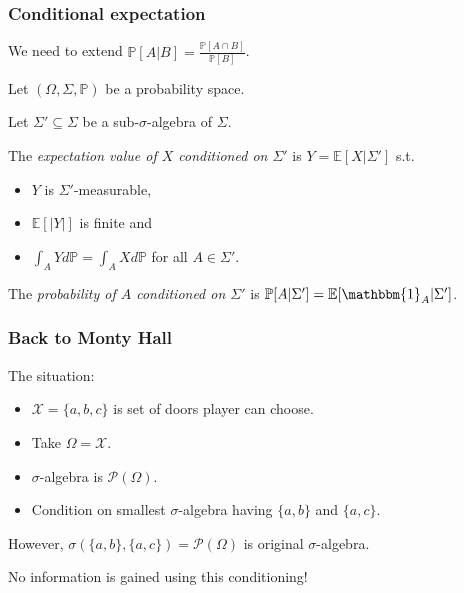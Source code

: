 \documentclass{beamer}
\theoremstyle{plain}
\theoremstyle{definition}
\theoremstyle{remark}
\renewcommand{\P}{\mathbb{P}}
\newcommand{\E}{\mathbb{E}}
\newcommand{\1}{\mathbbm{1}}
\begin{document}
\begin{frame}
\frametitle{Conditional expectation}
We need to extend $\P[A|B]=\frac{\P[A\cap B]}{\P[B]}$.\pause
\begin{definition}
Let $(\Omega,\Sigma,\P)$ be a probability space.

Let $\Sigma'\subseteq\Sigma$ be a sub-$\sigma$-algebra of $\Sigma$.

The \emph{expectation value of $X$ conditioned on $\Sigma'$} is $Y=\E[X|\Sigma']$ s.t.
\begin{itemize}
	\item $Y$ is $\Sigma'$-measurable,
	\item $\E[|Y|]$ is finite and
	\item $\int_A Yd\P=\int_A Xd\P$ for all $A\in\Sigma'$.
\end{itemize}
\end{definition}\pause

\begin{definition}
The \emph{probability of $A$ conditioned on $\Sigma'$} is $\P[A|\Sigma']=\E[\1_A|\Sigma']$.
\end{definition}
\end{frame}

\begin{frame}
\frametitle{Back to Monty Hall}
The situation:
\begin{itemize}
	\item $\mathcal{X}=\{a,b,c\}$ is set of doors player can choose.
	\item Take $\Omega=\mathcal{X}$.
	\item $\sigma$-algebra is $\mathcal{P}(\Omega)$.
	\item Condition on smallest $\sigma$-algebra having $\{a,b\}$ and $\{a,c\}$.
\end{itemize}
\pause

However, $\sigma(\{a,b\},\{a,c\})=\mathcal{P}(\Omega)$ is original $\sigma$-algebra.

No information is gained using this conditioning!
\end{frame}
\end{document}
